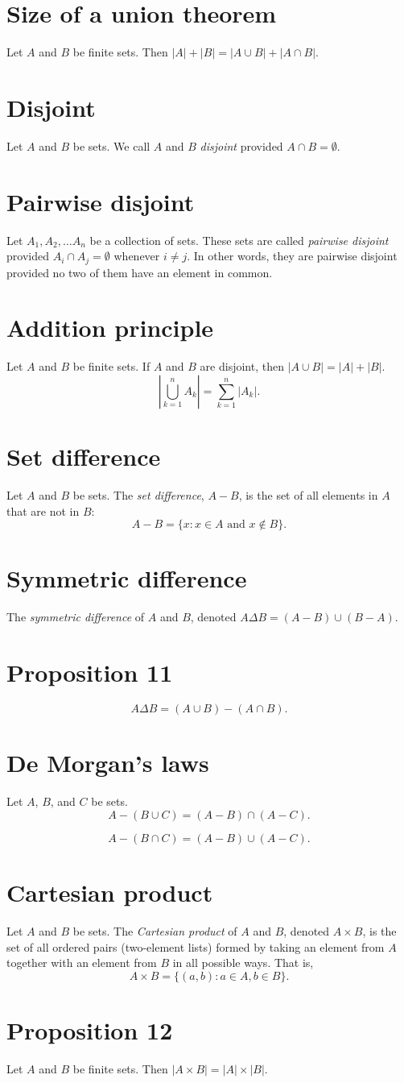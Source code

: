 \documentclass[12pt]{article}
\begin{document}
\section*{Size of a union theorem}
Let $A$ and $B$ be finite sets. Then $|A|+|B|=|A\cup B|+|A\cap B|$.
\section*{Disjoint}
Let $A$ and $B$ be sets. We call $A$ and $B$ \textit{disjoint} provided $A\cap B=\emptyset$.
\section*{Pairwise disjoint}
Let $A_1,A_2,\dots A_n$ be a collection of sets. These sets are called \textit{pairwise disjoint} provided $A_i\cap A_j=\emptyset$ whenever $i\neq j$. In other words, they are pairwise disjoint provided no two of them have an element in common.
\section*{Addition principle}
Let $A$ and $B$ be finite sets. If $A$ and $B$ are disjoint, then $|A\cup B|=|A|+|B|$.
\[\left|\bigcup_{k=1}^n{A_k}\right|=\sum_{k=1}^n{|A_k|}.\]
\section*{Set difference}
Let $A$ and $B$ be sets. The \textit{set difference}, $A-B$, is the set of all elements in $A$ that are not in $B$:
\[A-B=\{x:x\in A\text{ and }x \notin B\}.\]
\section*{Symmetric difference}
The \textit{symmetric difference} of $A$ and $B$, denoted $A\Delta B=(A-B)\cup(B-A)$.
\section*{Proposition 11}
\[A\Delta B=(A\cup B)-(A\cap B).\]
\section*{De Morgan's laws}
Let $A$, $B$, and $C$ be sets.
\[A-(B\cup C)=(A-B)\cap(A-C).\]

\[A-(B\cap C)=(A-B)\cup(A-C).\]
\section*{Cartesian product}
Let $A$ and $B$ be sets. The \textit{Cartesian product} of $A$ and $B$, denoted $A\times B$, is the set of all ordered pairs (two-element lists) formed by taking an element from $A$ together with an element from $B$ in all possible ways. That is,
\[A\times B=\{(a,b):a\in A,b\in B\}.\]
\section*{Proposition 12}
Let $A$ and $B$ be finite sets. Then $|A\times B|=|A|\times|B|$.
\end{document}
